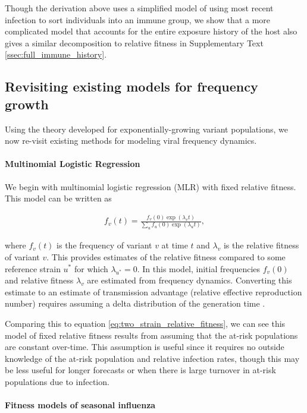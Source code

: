 \documentclass[11pt,oneside,letterpaper]{article}
\begin{document}
Though the derivation above uses a simplified model of using most recent infection to sort individuals into an immune group, we show that a more complicated model that accounts for the entire exposure history of the host also gives a similar decomposition to relative fitness in Supplementary Text \ref{ssec:full_immune_history}.

\subsection{Revisiting existing models for frequency growth}\label{ssec:existing_frequency_models}

Using the theory developed for exponentially-growing variant populations, we now re-visit existing methods for modeling viral frequency dynamics.

\paragraph{Multinomial Logistic Regression}%

We begin with multinomial logistic regression (MLR) with fixed relative fitness.
This model can be written as

\begin{align*}
    f_{v}(t) = \frac{f_{v}(0) \exp(\lambda_{v} t)}{\sum_{u} f_{u}(0) \exp(\lambda_{u} t)},
\end{align*}

where $f_{v}(t)$ is the frequency of variant $v$ at time $t$ and $\lambda_{v}$ is the relative fitness of variant $v$.
This provides estimates of the relative fitness compared to some reference strain $u^{*}$ for which $\lambda_{u^*} = 0$.
In this model, initial frequencies $f_{v}(0)$ and relative fitness $\lambda_{v}$ are estimated from frequency dynamics.
Converting this estimate to an estimate of transmission advantage (relative effective reproduction number) requires assuming a delta distribution of the generation time \cite{Wallinga2006}.

Comparing this to equation \ref{eq:two_strain_relative_fitness}, we can see this model of fixed relative fitness results from assuming that the at-risk populations are constant over-time.
This assumption is useful since it requires no outside knowledge of the at-risk population and relative infection rates, though this may be less useful for longer forecasts or when there is large turnover in at-risk populations due to infection.

\paragraph{Fitness models of seasonal influenza}%
\end{document}
